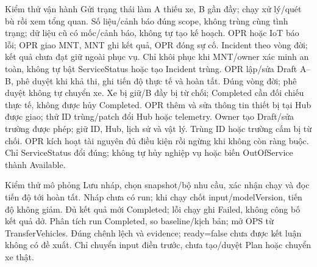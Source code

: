 \begin{SystemTestCases}{Kiểm thử vận hành}
{Gửi trạng thái làm A thiếu xe, B gần đầy; chạy xử lý/quét bù rồi xem tổng quan.}
{Số liệu/cảnh báo đúng scope, không trùng cùng tình trạng; dữ liệu cũ có mốc/cảnh báo, không tự tạo kế hoạch.}
{OPR hoặc IoT báo lỗi; OPR giao MNT, MNT ghi kết quả, OPR đóng sự cố.}
{Incident theo vòng đời; kết quả chưa đạt giữ ngoài phục vụ. Chỉ khôi phục khi MNT/owner xác minh an toàn, không tự bật ServiceStatus hoặc tạo Incident trùng.}
{OPR lập/sửa Draft A--B, phê duyệt khi khả thi, ghi tiến độ thực tế và hoàn tất.}
{Đúng vòng đời; phê duyệt không tự chuyển xe. Xe bị giữ/B đầy bị từ chối; Completed cần đối chiếu thực tế, không được hủy Completed.}
{OPR thêm và sửa thông tin thiết bị tại Hub được giao; thử ID trùng/patch đổi Hub hoặc telemetry.}
{Owner tạo Draft/sửa trường được phép; giữ ID, Hub, lịch sử và vật lý. Trùng ID hoặc trường cấm bị từ chối.}
{OPR kích hoạt tài nguyên đủ điều kiện rồi ngừng khi không còn ràng buộc.}
{Chỉ ServiceStatus đổi đúng; không tự hủy nghiệp vụ hoặc biến OutOfService thành Available.}
\end{SystemTestCases}

\begin{SystemTestCases}{Kiểm thử mô phỏng}
{Lưu nháp, chọn snapshot/bộ nhu cầu, xác nhận chạy và đọc tiến độ tới hoàn tất.}
{Nháp chưa có run; khi chạy chốt input/modelVersion, tiến độ không giảm. Đủ kết quả mới Completed; lỗi chạy ghi Failed, không công bố kết quả dở.}
{Phân tích run Completed, so baseline/kịch bản; mở OPS từ TransferVehicles.}
{Đúng chênh lệch và evidence; ready=false chưa được kết luận không có đề xuất. Chỉ chuyển input điền trước, chưa tạo/duyệt Plan hoặc chuyển xe thật.}
\end{SystemTestCases}

